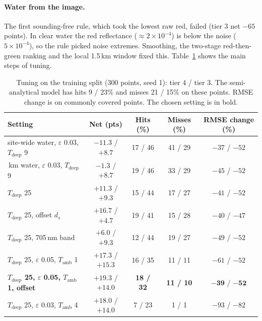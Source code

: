 \documentclass[remotesensing,article,submit,pdftex]{Definitions/mdpi}
\begin{document}
\paragraph{Water from the image.} The first sounding-free rule, which took the lowest raw red, failed (tier 3 net $-65$ points). In clear water the red reflectance ($\approx 2\times10^{-4}$) is below the noise ($5\times10^{-4}$), so the rule picked noise extremes. Smoothing, the two-stage red-then-green ranking and the local 1.5\,km window fixed this. Table~\ref{tab:tuning} shows the main steps of tuning.

\begin{table}[H]
\small
\caption{Tuning on the training split (300 points, seed 1): tier 4 / tier 3. The semi-analytical model has hits 9 / 23\% and misses 21 / 15\% on these points. RMSE change is on commonly covered points. The chosen setting is in bold.\label{tab:tuning}}
\begin{tabularx}{\textwidth}{>{\raggedright\arraybackslash}Xcccc}
\toprule
\textbf{Setting} & \textbf{Net (pts)} & \textbf{Hits (\%)} & \textbf{Misses (\%)} & \textbf{RMSE change (\%)}\\
\midrule
site-wide water, $\varepsilon$ 0.03, $T_\mathrm{deep}$ 9 & $-11.3$ / $+8.7$ & 17 / 46 & 41 / 29 & $-37$ / $-52$\\
1.5\,km water, $\varepsilon$ 0.03, $T_\mathrm{deep}$ 9 & $-1.3$ / $+8.7$ & 19 / 46 & 33 / 29 & $-45$ / $-52$\\
\quad $T_\mathrm{deep}$ 25 & $+11.3$ / $+9.3$ & 15 / 44 & 17 / 27 & $-41$ / $-52$\\
\quad $T_\mathrm{deep}$ 25, offset $d_s$ & $+16.7$ / $+4.7$ & 19 / 41 & 15 / 28 & $-40$ / $-47$\\
\quad $T_\mathrm{deep}$ 25, 705\,nm band & $+6.0$ / $+9.3$ & 12 / 44 & 19 / 27 & $-49$ / $-52$\\
\quad $T_\mathrm{deep}$ 25, $\varepsilon$ 0.05, $T_\mathrm{amb}$ 1 & $+17.3$ / $+15.3$ & 16 / 35 & 11 / 11 & $-61$ / $-52$\\
\quad \textbf{$T_\mathrm{deep}$ 25, $\varepsilon$ 0.05, $T_\mathrm{amb}$ 1, offset} & $\mathbf{+19.3}$ / $\mathbf{+14.0}$ & \textbf{18 / 32} & \textbf{11 / 10} & $\mathbf{-39}$ / $\mathbf{-52}$\\
\quad $T_\mathrm{deep}$ 25, $\varepsilon$ 0.03, $T_\mathrm{amb}$ 4 & $+18.0$ / $+14.0$ & 7 / 23 & 1 / 1 & $-93$ / $-82$\\
\bottomrule
\end{tabularx}
\end{table}
\end{document}
